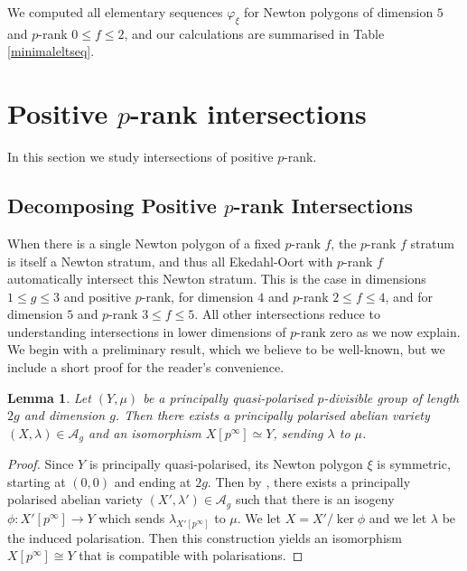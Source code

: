 \documentclass[11pt,table]{amsart}
\numberwithin{equation}{section}
\newtheorem{lem}[thm]{Lemma}
\theoremstyle{definition}
\theoremstyle{remark}
\theoremstyle{remark}
\begin{document}
 
 We computed all elementary sequences $\varphi_{\xi}$ for Newton polygons of dimension $5$ and $p$-rank $ 0 \le f \le 2$, and our calculations are summarised in Table \ref{minimaleltseq}.

\section{Positive $p$-rank intersections} \label{positivesections}
In this section we study intersections of positive $p$-rank.
\subsection{Decomposing Positive $p$-rank Intersections}
When there is a single Newton polygon of a fixed $p$-rank $f$, the $p$-rank $f$ stratum is itself a Newton stratum, and thus  all Ekedahl-Oort with $p$-rank $f$ automatically intersect this Newton stratum. This is the case in dimensions $1 \le g \le 3$ and positive $p$-rank, for dimension $4$ and $p$-rank $2 \le f \le 4$, and for dimension $5$ and $p$-rank $3 \le f \le 5$. All other intersections reduce to understanding intersections in lower dimensions of $p$-rank zero as we now explain. We begin with a preliminary result, which we believe to be well-known, but we include a short proof for the reader's convenience. 


\begin{lem} \label{pdivgp}
Let $(Y,\mu)$ be a principally quasi-polarised $p$-divisible group of length $2g$ and dimension $g$. Then there exists a principally polarised abelian variety $(X,\lambda) \in \mathcal{A}_g$ and an isomorphism $X[p^\infty] \simeq Y$, sending $\lambda$ to $\mu$.
\end{lem}
\begin{proof}
Since $Y$ is principally quasi-polarised, its Newton polygon $\xi$ is symmetric, starting at $(0,0)$ and ending at $2g$. Then by \cite[page 98]{MR3077121}, there exists a principally polarised abelian variety $(X',\lambda') \in \mathcal{A}_g$ such that there is an isogeny $\phi: X'[p^\infty] \to Y$ which sends $\lambda_{X'[p^\infty]}$ to $\mu$. We let $X=X'/\ker \phi$ and we let $\lambda$ be the induced polarisation. Then this construction yields an isomorphism $X[p^\infty] \cong Y$ that is compatible with polarisations.
\end{proof}
\end{document}
